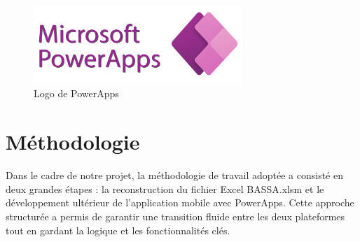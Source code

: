\documentclass[a4paper, oneside, 12pt, final]{extreport}
\begin{document}
\begin{figure}[h]
    \centering
    \includegraphics[width=0.7\textwidth]{powerapps.png} %
    \caption{Logo de PowerApps}
    \label{fig:Logo de PowerApps}
\end{figure}
\section{Méthodologie}
Dans le cadre de notre projet, la méthodologie de travail adoptée a consisté en deux grandes étapes : la reconstruction du fichier Excel BASSA.xlsm et le développement ultérieur de l'application mobile avec PowerApps. Cette approche structurée a permis de garantir une transition fluide entre les deux plateformes tout en gardant la logique et les fonctionnalités clés.
\end{document}
